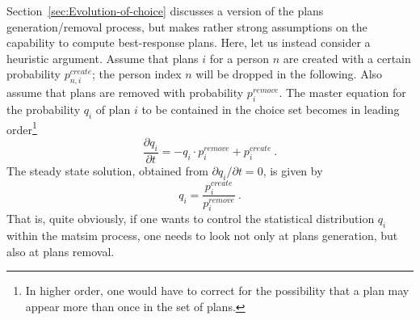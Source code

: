 Section~\ref{sec:Evolution-of-choice} discusses a version of the plans generation/removal process, but makes rather strong assumptions on the capability to compute best-response plans.  Here, let us instead consider a heuristic argument.
Assume that plans $i$ for a person $n$ are created with a certain probability $p^{create}_{n,i}$; the person index $n$ will be dropped in the following.  Also assume that plans are removed with probability $p^{remove}_{i}$.  The master equation for the probability $q_{i}$ of plan $i$ to be contained in the choice set becomes in leading order\footnote{%
%
In higher order, one would have to correct for the possibility that a plan may appear more than once in the set of plans.
%
}
\[
\frac{\partial q_{i}}{\partial t}
%
= - q_{i} \cdot p^{remove}_{i} + p^{create}_{i} \ .
\]
The steady state solution, obtained from $\partial q_{i}/\partial t = 0$, is given by
\begin{equation}
q_{i} = \frac{p^{create}_{i}}{p^{remove}_{i}} \ .
\label{eq:5}
\end{equation}
That is, quite obviously, if one wants to control the statistical distribution $q_{i}$ within the \gls{matsim} process, one needs to look not only at plans generation, but also at plans removal.


